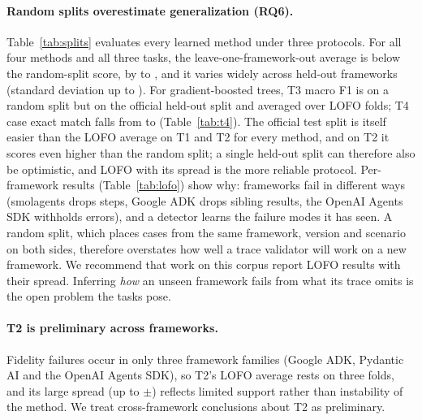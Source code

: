 \documentclass[10pt]{article}
\begin{document}
\paragraph{Random splits overestimate generalization (RQ6).} Table~\ref{tab:splits} evaluates every learned method under three protocols. For all four methods and all three tasks, the leave-one-framework-out average is below the random-split score, by \dropMin{} to \dropMax{}, and it varies widely across held-out frameworks (standard deviation up to \lofoSdMax). For gradient-boosted trees, T3 macro F1 is \iidGbmTThreeMean{} on a random split but \gbmTThreeMacro{} on the official held-out split and \lofoGbmTThreeMean{} averaged over LOFO folds; T4 case exact match falls from \iidTFourExact{} to \gbmTFourExact{} (Table~\ref{tab:t4}). The official test split is itself easier than the LOFO average on T1 and T2 for every method, and on T2 it scores even higher than the random split; a single held-out split can therefore also be optimistic, and LOFO with its spread is the more reliable protocol. Per-framework results (Table~\ref{tab:lofo}) show why: frameworks fail in different ways (smolagents drops steps, Google ADK drops sibling results, the OpenAI Agents SDK withholds errors), and a detector learns the failure modes it has seen. A random split, which places cases from the same framework, version and scenario on both sides, therefore overstates how well a trace validator will work on a new framework. We recommend that work on this corpus report LOFO results with their spread. Inferring \emph{how} an unseen framework fails from what its trace omits is the open problem the tasks pose.

\paragraph{T2 is preliminary across frameworks.} Fidelity failures occur in only three framework families (Google ADK, Pydantic AI and the OpenAI Agents SDK), so T2's LOFO average rests on three folds, and its large spread (up to $\pm$\lofoSdMax) reflects limited support rather than instability of the method. We treat cross-framework conclusions about T2 as preliminary.
\end{document}
